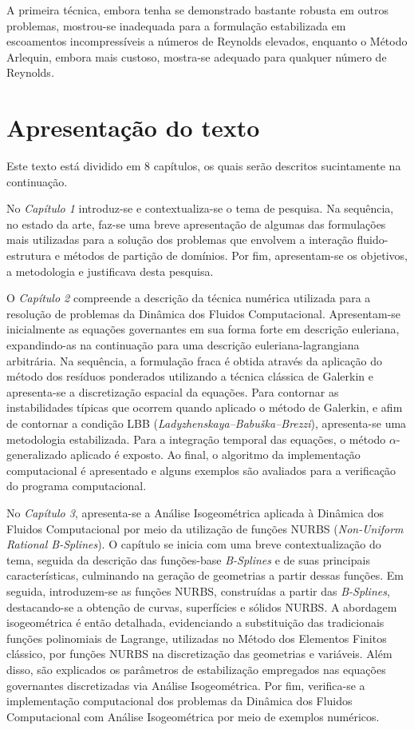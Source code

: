 A primeira técnica, embora tenha se demonstrado bastante robusta em outros problemas, mostrou-se inadequada para a formulação estabilizada em escoamentos incompressíveis a números de Reynolds elevados, enquanto o Método Arlequin, embora mais custoso, mostra-se adequado para qualquer número de Reynolds.

\section{Apresentação do texto}

Este texto está dividido em 8 capítulos, os quais serão descritos sucintamente na continuação.

No \textit{Capítulo 1} introduz-se e contextualiza-se o tema de pesquisa. Na sequência, no estado da arte, faz-se uma breve apresentação de algumas das formulações mais utilizadas para a solução dos problemas que envolvem a interação fluido-estrutura e métodos de partição de domínios. Por fim, apresentam-se os objetivos, a metodologia e justificava desta pesquisa.

O \textit{Capítulo 2} compreende a descrição da técnica numérica utilizada para a resolução de problemas da Dinâmica dos Fluidos Computacional. 
Apresentam-se inicialmente as equações governantes em sua forma forte em descrição euleriana, expandindo-as na continuação para uma descrição euleriana-lagrangiana arbitrária. Na sequência, a formulação fraca é obtida através da aplicação do método dos resíduos ponderados utilizando a técnica clássica de Galerkin e apresenta-se a discretização espacial da equações. Para contornar as instabilidades típicas que ocorrem quando aplicado o método de Galerkin, e afim de contornar a condição LBB (\textit{Ladyzhenskaya–Babuška–Brezzi}), apresenta-se uma metodologia estabilizada. Para a integração temporal das equações, o método $\alpha$-generalizado aplicado é exposto. Ao final, o algoritmo da implementação computacional é apresentado e alguns exemplos são avaliados para a verificação do programa computacional.

No \textit{Capítulo 3}, apresenta-se a Análise Isogeométrica aplicada à Dinâmica dos Fluidos Computacional por meio da utilização de funções NURBS (\textit{Non-Uniform Rational B-Splines}). O capítulo se inicia com uma breve contextualização do tema, seguida da descrição das funções-base \textit{B-Splines} e de suas principais características, culminando na geração de geometrias a partir dessas funções. Em seguida, introduzem-se as funções NURBS, construídas a partir das \textit{B-Splines}, destacando-se a obtenção de curvas, superfícies e sólidos NURBS. A abordagem isogeométrica é então detalhada, evidenciando a substituição das tradicionais funções polinomiais de Lagrange, utilizadas no Método dos Elementos Finitos clássico, por funções NURBS na discretização das geometrias e variáveis. Além disso, são explicados os parâmetros de estabilização empregados nas equações governantes discretizadas via Análise Isogeométrica. Por fim, verifica-se a implementação computacional dos problemas da Dinâmica dos Fluidos Computacional com Análise Isogeométrica por meio de exemplos numéricos.

